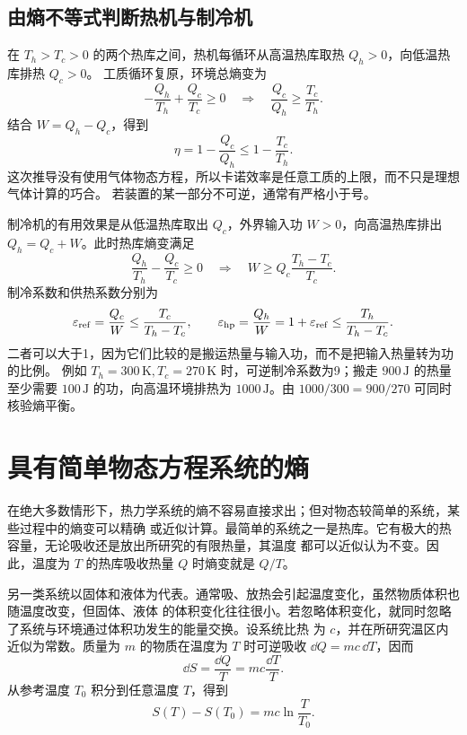 {\subsection{由熵不等式判断热机与制冷机}

在 $T_h>T_c>0$ 的两个热库之间，热机每循环从高温热库取热 $Q_h>0$，向低温热库排热 $Q_c>0$。
工质循环复原，环境总熵变为
\[
 -\frac{Q_h}{T_h}+\frac{Q_c}{T_c}\ge0
 \quad\Longrightarrow\quad
 \frac{Q_c}{Q_h}\ge\frac{T_c}{T_h}.
\]
结合 $W=Q_h-Q_c$，得到
\begin{equation}
 \eta=1-\frac{Q_c}{Q_h}\le1-\frac{T_c}{T_h}.
\end{equation}
这次推导没有使用气体物态方程，所以卡诺效率是任意工质的上限，而不只是理想气体计算的巧合。
若装置的某一部分不可逆，通常有严格小于号。

制冷机的有用效果是从低温热库取出 $Q_c$，外界输入功 $W>0$，向高温热库排出
$Q_h=Q_c+W$。此时热库熵变满足
\[
 \frac{Q_h}{T_h}-\frac{Q_c}{T_c}\ge0
 \quad\Longrightarrow\quad
 W\ge Q_c\frac{T_h-T_c}{T_c}.
\]
制冷系数和供热系数分别为
\begin{equation}
 \varepsilon_{\rm ref}=\frac{Q_c}{W}\le\frac{T_c}{T_h-T_c},\qquad
 \varepsilon_{\rm hp}=\frac{Q_h}{W}=1+\varepsilon_{\rm ref}
 \le\frac{T_h}{T_h-T_c}.
\end{equation}
二者可以大于1，因为它们比较的是搬运热量与输入功，而不是把输入热量转为功的比例。
例如 $T_h=300\,\mathrm K,T_c=270\,\mathrm K$ 时，可逆制冷系数为9；搬走
$900\,\mathrm J$ 的热量至少需要 $100\,\mathrm J$ 的功，向高温环境排热为
$1000\,\mathrm J$。由 $1000/300=900/270$ 可同时核验熵平衡。


\section{具有简单物态方程系统的熵}

在绝大多数情形下，热力学系统的熵不容易直接求出；但对物态较简单的系统，某些过程中的熵变可以精确
或近似计算。最简单的系统之一是热库。它有极大的热容量，无论吸收还是放出所研究的有限热量，其温度
都可以近似认为不变。因此，温度为 $T$ 的热库吸收热量 $Q$ 时熵变就是 $Q/T$。

另一类系统以固体和液体为代表。通常吸、放热会引起温度变化，虽然物质体积也随温度改变，但固体、液体
的体积变化往往很小。若忽略体积变化，就同时忽略了系统与环境通过体积功发生的能量交换。设系统比热
为 $c$，并在所研究温区内近似为常数。质量为 $m$ 的物质在温度为 $T$ 时可逆吸收
$\dd Q=mc\,\dd T$，因而
\[
  \dd S=\frac{\dd Q}{T}=mc\frac{\dd T}{T}.
\]
从参考温度 $T_0$ 积分到任意温度 $T$，得到
\begin{equation}
  \boxed{S(T)-S(T_0)=mc\ln\frac{T}{T_0}}.
\end{equation}

}
